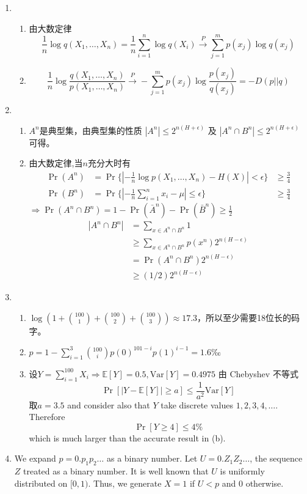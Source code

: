 \documentclass{article}
\def\E{\mathbb{E}}
\def\Var{\textrm{Var}}
\begin{document}
\begin{enumerate}
\item
\begin{enumerate}[label=(\alph*)] 
\item 由大数定律
$$
\frac{1}{n}\log q(X_1,\dots,X_n) = \frac{1}{n}\sum_{i=1}^n \log q(X_i) \xrightarrow{P}  \sum_{j=1}^m p(x_j)\log q(x_j)
$$
\item 
$$
\frac{1}{n}\log \frac{q(X_1,\dots,X_n)}{p(X_1,\dots,X_n)} \xrightarrow{P} -\sum_{j=1}^m p(x_j)\log\frac{p(x_j)}{q(x_j)} = -D(p||q)
$$
\end{enumerate}

\item
\begin{enumerate}[label=(\alph*)] 
\item $A^n$是典型集，由典型集的性质 $|A^n| \leq 2^{n(H+\epsilon)}$ 及 $|A^n \cap B^n | \leq 2^{n(H+\epsilon)}$ 可得。
\item 由大数定律,当$n$充分大时有
\begin{align*}
\Pr(A^n) & =  \Pr\{|-\frac{1}{n} \log p(X_1,\dots,X_n)-H(X)|  <\epsilon \}  & \geq \frac{3}{4}\\
\Pr(B^n) & =  \Pr\{|-\frac{1}{n}\sum_{i=1}^n x_i - \mu |\leq \epsilon \} & \geq \frac{3}{4}
\end{align*}
$\Rightarrow \Pr(A^n \cap B^n)=1-\Pr(\bar{A}^n)-\Pr(\bar{B}^n)\geq \frac{1}{2}$
\begin{align*}
|A^n \cap B^n| & = \sum_{x\in A^n \cap B^n} 1 \\
                & \geq \sum_{x\in A^n \cap B^n} p(x^n)2^{n(H-\epsilon)} \\
                & = \Pr(A^n \cap B^n)2^{n(H-\epsilon)} \\
                & \geq (1/2)2^{n(H-\epsilon)} 
\end{align*}

\end{enumerate}
\item
\begin{enumerate}[label=(\alph*)] 
\item $\log (1+\binom{100}{1}+\binom{100}{2}+\binom{100}{3}) \approx 17.3$，所以至少需要18位长的码字。
\item $ p = 1-\sum_{i=1}^3 \binom{100}{i}p(0)^{101-i}p(1)^{i-1}=1.6‰$
\item 设$Y=\sum_{i=1}^{100} X_i \Rightarrow \E[Y]=0.5,\Var[Y]=0.4975$
由 Chebyshev 不等式 
$$
\Pr[|Y-\E[Y]|\geq a]\leq \frac{1}{a^2}\Var[Y]
$$
取$a=3.5$ and consider also that $Y$ take discrete values $1,2,3,4,\dots$. Therefore
$$
\Pr[Y\geq 4] \leq 4\%
$$
which is much larger than the accurate result in (b).
\end{enumerate}
\item
We expand $p = 0.p_1p_2\dots$ as a binary number. Let $U = 0.Z_1Z_2\dots$, the sequence $Z$ treated as a binary number.
It is well known that $U$ is uniformly distributed on $[0,1)$. Thus, we generate $X = 1$ if $U < p$ and $0$ otherwise.


\end{enumerate}
\end{document}
